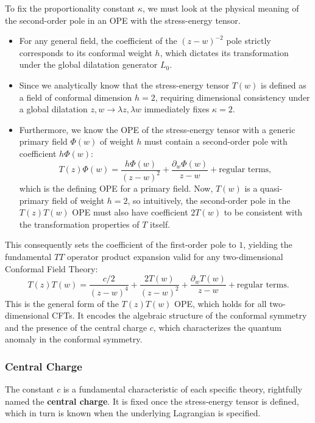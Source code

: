 To fix the proportionality constant \(\kappa\), we must look at the physical meaning of the second-order pole in an OPE with the stress-energy tensor.
\begin{itemize}
    \item For any general field, the coefficient of the \((z-w)^{-2}\) pole strictly corresponds to its conformal weight \(h\), which dictates its transformation under the global dilatation generator \(L_0\).
    \item Since we analytically know that the stress-energy tensor \(T(w)\) is defined as a field of conformal dimension \(h = 2\), requiring dimensional consistency under a global dilatation \(z, w \to \lambda z, \lambda w\) immediately fixes \(\kappa = 2\).
    \item Furthermore, we know the OPE of the stress-energy tensor with a generic primary field \(\Phi(w)\) of weight \(h\) must contain a second-order pole with coefficient \(h\Phi(w)\):
          \[
              T(z)\Phi(w) = \frac{h\Phi(w)}{(z-w)^2} + \frac{\partial_w \Phi(w)}{z-w} + \text{regular terms},
          \]
          which is the defining OPE for a primary field. Now, \(T(w)\) is a quasi-primary field of weight \(h = 2\), so intuitively, the second-order pole in the \(T(z)T(w)\) OPE must also have coefficient \(2T(w)\) to be consistent with the transformation properties of \(T\) itself.
\end{itemize}

This consequently sets the coefficient of the first-order pole to \(1\), yielding the fundamental \(TT\) operator product expansion valid for any two-dimensional Conformal Field Theory:
\begin{equation}
    T(z)T(w) = \frac{c/2}{(z-w)^4} + \frac{2T(w)}{(z-w)^2} + \frac{\partial_w T(w)}{z-w} + \text{regular terms}.
    \label{eq:TT_OPE_CFT2}
\end{equation}
This is the general form of the \(T(z)T(w)\) OPE, which holds for all two-dimensional CFTs. It encodes the algebraic structure of the conformal symmetry and the presence of the central charge \(c\), which characterizes the quantum anomaly in the conformal symmetry.

\subsubsection{Central Charge}

The constant \(c\) is a fundamental characteristic of each specific theory, rightfully named the \textbf{central charge}. It is fixed once the stress-energy tensor is defined, which in turn is known when the underlying Lagrangian is specified.


